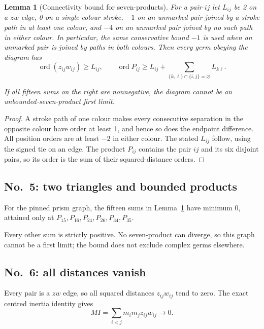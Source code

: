 \documentclass[11pt]{amsart}
\newtheorem{lemma}[theorem]{Lemma}
\theoremstyle{remark}
\newcommand{\ord}{\operatorname{ord}}
\newcommand{\Needspace}[1]{\par\ifdim\dimexpr\pagegoal-\pagetotal\relax<#1\newpage\fi}
\begin{document}
\Needspace{12\baselineskip}
\begin{lemma}[Connectivity bound for seven-products]\label{lem:excluded-connectivity}
For a pair $ij$ let $L_{ij}$ be 2 on a $zw$ edge, 0 on a
single-colour stroke, $-1$ on an unmarked pair joined by a
stroke path in at least one colour, and $-4$ on an unmarked
pair joined by no such path in either colour. In particular,
the same conservative bound $-1$ is used when an unmarked pair
is joined by paths in both colours. Then every germ obeying the diagram has
\begin{equation}\label{eq:connectivity-product-bound}
\ord(z_{ij}w_{ij})\ge L_{ij},\qquad
\ord P_{ij}\ge L_{ij}+\sum_{\{k,\ell\}\cap\{i,j\}=\varnothing}L_{k\ell}.
\end{equation}

If all fifteen sums on the right are nonnegative, the diagram
cannot be an unbounded-seven-product first limit.

\end{lemma}

\begin{proof}
A stroke path of one colour makes every consecutive separation
in the opposite colour have order at least 1, and hence so
does the endpoint difference. All position orders are at least
$-2$ in either colour. The stated $L_{ij}$ follow, using the
signed tie on an edge. The product $P_{ij}$ contains the pair
$ij$ and its six disjoint pairs, so its order is the sum of
their squared-distance orders.
\end{proof}

\subsection{No.~5: two triangles and bounded products}
For the pinned prism graph, the fifteen sums in
Lemma~\ref{lem:excluded-connectivity} have minimum
$0$, attained only at
$P_{15},P_{16},P_{24},P_{26},P_{34},P_{35}.$

Every other sum is strictly positive. No seven-product
can diverge, so this graph cannot be a first limit;
the bound does not exclude complex germs elsewhere.
\subsection{No.~6: all distances vanish}\label{sec:no6-inertia}
Every pair is a $zw$ edge, so all squared distances
$z_{ij}w_{ij}$ tend to zero. The exact centred
inertia identity gives
\[
MI=\sum_{i<j}m_im_jz_{ij}w_{ij}\longrightarrow0.
\]
\end{document}
